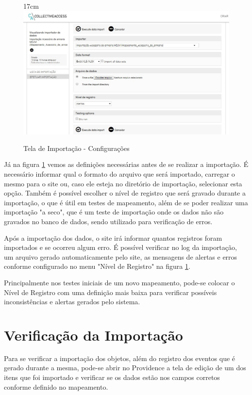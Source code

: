 \documentclass[a4paper,12pt,oneside,onecolumn,final,fleqn]{repUERJ}
\begin{document}
\begin{figure}[!ht]{17cm}
	\includegraphics[width=15cm, left]{figuras/tela_imp.jpg}
	\caption{Tela de Importação - Configurações} \label{fig:import}
\end{figure}

Já na figura \ref{fig:import} vemos as definições necessárias antes de se realizar a importação. É necessário informar qual o formato do arquivo que será importado, carregar o mesmo para o site ou, caso ele esteja no diretório de importação, selecionar esta opção. Também é possível escolher o nível de registro que será gravado durante a importação, o que é útil em testes de mapeamento, além de se poder realizar uma importação "a seco", que é um teste de importação onde os dados não são gravados no banco de dados, sendo utilizado para verificação de erros.

Após a importação dos dados, o site irá informar quantos registros foram importados e se ocorreu algum erro. É possível verificar no log da importação, um arquivo gerado automaticamente pelo site, as mensagens de alertas e erros conforme configurado no menu "Nível de Registro" na figura \ref{fig:import}. 

Principalmente nos testes iniciais de um novo mapeamento, pode-se colocar o Nível de Registro com uma definição mais baixa para verificar possíveis inconsistências e alertas gerados pelo sistema. 

\section{Verificação da Importação}

Para se verificar a importação dos objetos, além do registro dos eventos que é gerado durante a mesma, pode-se abrir no Providence a tela de edição de um dos itens que foi importado e verificar se os dados estão nos campos corretos conforme definido no mapeamento.
\end{document}

